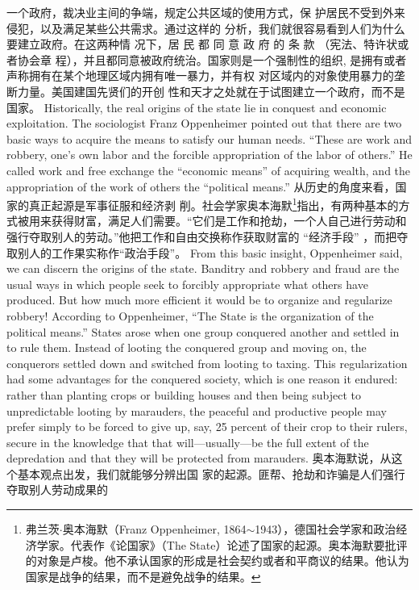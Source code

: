 \begin{paracol}{2}
一个政府，裁决业主间的争端，规定公共区域的使用方式，保
护居民不受到外来侵犯，以及满足某些公共需求。通过这样的
分析，我们就很容易看到人们为什么要建立政府。在这两种情
况下，居 民 都 同 意 政 府 的 条 款 （宪法、特许状或者协会章
程），并且都同意被政府统治。国家则是一个强制性的组织,
是拥有或者声称拥有在某个地理区域内拥有唯一暴力，并有权
对区域内的对象使用暴力的垄断力量。美国建国先贤们的开创
性和天才之处就在于试图建立一个政府，而不是国家。
\switchcolumn*
Historically, the real origins of the state lie in conquest and
economic exploitation. The sociologist Franz Oppenheimer
pointed out that there are two basic ways to acquire the means
to satisfy our human needs. ``These are work and robbery, one's
own labor and the forcible appropriation of the labor of others.''
He called work and free exchange the ``economic means'' of acquiring wealth, and the appropriation of the work of others the
``political means.''
\switchcolumn
从历史的角度来看，国家的真正起源是军事征服和经济剥
削。社会学家奥本海默\footnote{弗兰茨$\cdot$奥本海默（Franz  Oppenheimer, 1864$\sim$1943），德国社会学家和政治经济学家。代表作《论国家》（The State）论述了国家的起源。奥本海默要批评的对象是卢梭。他不承认国家的形成是社会契约或者和平商议的结果。他认为国家是战争的结果，而不是避免战争的结果。}指出，有两种基本的方式被用来获得财富，满足人们需要。“它们是工作和抢劫，一个人自己进行劳动和强行夺取别人的劳动。”他把工作和自由交换称作获取财富的 “经济手段” ，而把夺取别人的工作果实称作“政治手段”。
\switchcolumn*
From this basic insight, Oppenheimer said, we can discern
the origins of the state. Banditry and robbery and fraud are the
usual ways in which people seek to forcibly appropriate what
others have produced. But how much more efficient it would be
to organize and regularize robbery! According to Oppenheimer,
``The State is the organization of the political means.'' States
arose when one group conquered another and settled in to rule
them. Instead of looting the conquered group and moving on,
the conquerors settled down and switched from looting to taxing. This regularization had some advantages for the conquered
society, which is one reason it endured: rather than planting
crops or building houses and then being subject to unpredictable looting by marauders, the peaceful and productive
people may prefer simply to be forced to give up, say, 25 percent of their crop to their rulers, secure in the knowledge that
that will---usually---be the full extent of the depredation and
that they will be protected from marauders.
\switchcolumn
奥本海默说，从这个基本观点出发，我们就能够分辨出国
家的起源。匪帮、抢劫和诈骗是人们强行夺取别人劳动成果的

\end{paracol}
